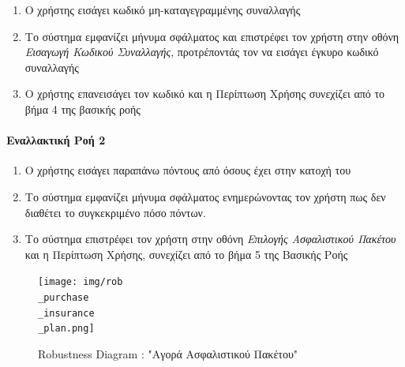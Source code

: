 \documentclass{../ol-softwaremanual}
\begin{document}
	\begin{enumerate}
		\item Ο χρήστης εισάγει κωδικό μη-καταγεγραμμένης συναλλαγής
		\item Το σύστημα εμφανίζει μήνυμα σφάλματος και επιστρέφει τον χρήστη στην  οθόνη \textit{Εισαγωγή Κωδικού Συναλλαγής}, προτρέποντάς τον να εισάγει έγκυρο κωδικό συναλλαγής
		\item Ο χρήστης επανεισάγει τον κωδικό και η Περίπτωση Χρήσης συνεχίζει από το βήμα 4 της βασικής ροής
	\end{enumerate}
	
	\paragraph{Εναλλακτική Ροή 2}
	\begin{enumerate}
		\item Ο χρήστης εισάγει παραπάνω πόντους από όσους έχει στην κατοχή του
		\item Το σύστημα εμφανίζει μήνυμα σφάλματος ενημερώνοντας τον χρήστη πως δεν διαθέτει το συγκεκριμένο πόσο πόντων.
		\item Το σύστημα επιστρέφει τον χρήστη στην οθόνη \textit{Επιλογής Ασφαλιστικού Πακέτου} και η Περίπτωση Χρήσης, συνεχίζει από το βήμα 5 της Βασικής Ροής
	\end{enumerate}
	
	\begin{figure}[htbp!]
		\texttt{[image: img/rob\\\_purchase\\\_insurance\\\_plan.png]}
		\caption{\en Robustness Diagram : "\gr Αγορά Ασφαλιστικού Πακέτου\en"\gr}
	\end{figure}
	
	\newpage
	\centering
	
\end{document}
